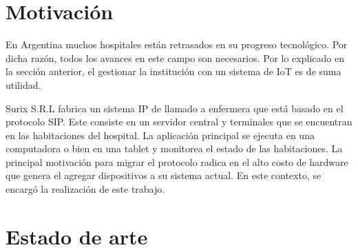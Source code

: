 \section{Motivación}


En Argentina muchos hospitales están retrasados en su progreso tecnológico. Por dicha razón, todos los avances en este campo son  necesarios. Por lo explicado en la sección anterior, el gestionar la institución con un sistema de IoT es de suma utilidad.

Surix S.R.L fabrica un sistema IP de llamado a enfermera que está basado en el protocolo SIP. Este consiste en un servidor central y terminales que se encuentran en las habitaciones del hospital. La aplicación principal se ejecuta en una computadora o bien en una tablet y monitorea el estado
de las habitaciones. La principal motivación para migrar el protocolo radica en el alto costo de hardware que genera el agregar dispositivos a su sistema actual. En este contexto, se encargó la realización de este trabajo.



\section{Estado de arte}

